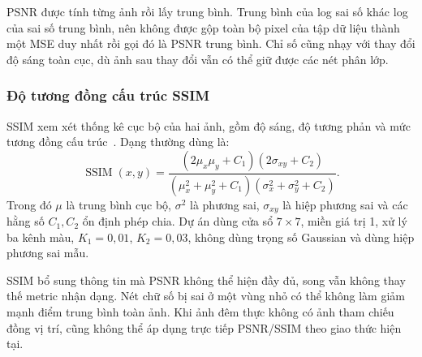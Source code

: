 PSNR được tính từng ảnh rồi lấy trung bình. Trung bình của log sai số khác log của sai số trung bình, nên không được gộp toàn bộ pixel của tập dữ liệu thành một MSE duy nhất rồi gọi đó là PSNR trung bình. Chỉ số cũng nhạy với thay đổi độ sáng toàn cục, dù ảnh sau thay đổi vẫn có thể giữ được các nét phân lớp.

\subsubsection{Độ tương đồng cấu trúc SSIM}
SSIM xem xét thống kê cục bộ của hai ảnh, gồm độ sáng, độ tương phản và mức tương đồng cấu trúc~\cite{ssim}. Dạng thường dùng là:
\begin{equation}
\operatorname{SSIM}(x,y)=
\frac{(2\mu_x\mu_y+C_1)(2\sigma_{xy}+C_2)}
{(\mu_x^2+\mu_y^2+C_1)(\sigma_x^2+\sigma_y^2+C_2)}.
\end{equation}
Trong đó $\mu$ là trung bình cục bộ, $\sigma^2$ là phương sai, $\sigma_{xy}$ là hiệp phương sai và các hằng số $C_1,C_2$ ổn định phép chia. Dự án dùng cửa sổ $7\times7$, miền giá trị 1, xử lý ba kênh màu, $K_1=0,01$, $K_2=0,03$, không dùng trọng số Gaussian và dùng hiệp phương sai mẫu.

SSIM bổ sung thông tin mà PSNR không thể hiện đầy đủ, song vẫn không thay thế metric nhận dạng. Nét chữ số bị sai ở một vùng nhỏ có thể không làm giảm mạnh điểm trung bình toàn ảnh. Khi ảnh đêm thực không có ảnh tham chiếu đồng vị trí, cũng không thể áp dụng trực tiếp PSNR/SSIM theo giao thức hiện tại.
